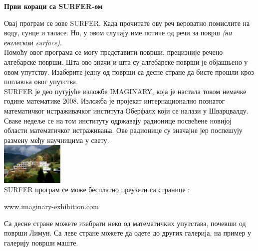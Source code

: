 \documentclass[sans]{amsart}
\newlength{\galIntroHeight}
\newlength{\galIntroWidth}
\newenvironment{surferGalIntroPage}{%
  \newpage
  \special{papersize=\galIntroHeight,\galIntroWidth}
  \pagecolor{textHgColor}
  \color{textFgColor}
  \thispagestyle{empty}
  \begin{flushleft}}%
  {\end{flushleft}}
\newenvironment{galTitle}{\bf}{

}
\newenvironment{surferText}{}{}
\begin{document}
\footnotesize
% 
%
\begin{surferGalIntroPage}
  \begin{galTitle}Први кораци са SURFER-ом\end{galTitle}
  \begin{surferText}
Овај програм се зове SURFER. Када прочитате ову реч вероватно помислите на воду, сунце и таласе. Но, у овом случају име потиче од речи за површ {\it (на енглеском surface)}.
\\
Помоћу овог програма се могу представити површи, прецизније речено алгебарске површи. Шта ово значи и шта су алгебарске површи је објашњено у овом упутству. Изаберите једну од површи са десне стране да бисте прошли кроз поглавља овог упутства.\\
SURFER је део путујуће изложбе IMAGINARY, која је настала током немачке године математике 2008. Изложба је пројекат интернационално познатог математичког истраживачког института Оберфалх који се налази у Шварцвалду. Сваке недеље се на том институту одржавају радионице посвећене новијој области математичког истраживања. Ове радионице су значајне јер поспешују размену међу научницима у свету.  \\
\vspace{0.2cm} \hspace{3.5cm}\includegraphics[width=3cm]{./../../common/images/photo_mfo.jpg}\\
SURFER програм се може  бесплатно преузети са странице : \\
\begin{centering}
www.imaginary-exhibition.com\\
\end{centering}
 \vspace{0.2cm}
Са десне стране можете изабрати неко од математичких упутстава, почевши од површи Лимун. Са леве стране можете да одете до других галерија, на пример у галерију површи маште.
   
     \end{surferText}
\end{surferGalIntroPage}
%
%
%
\end{document}
